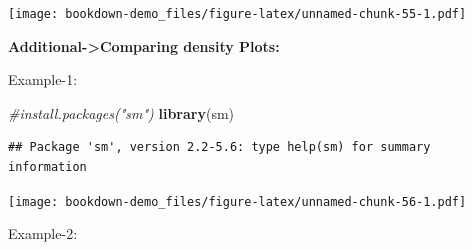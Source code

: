 \documentclass[]{book}
\newenvironment{Shaded}{\begin{snugshade}}{\end{snugshade}}
\newcommand{\KeywordTok}[1]{\textcolor[rgb]{0.13,0.29,0.53}{\textbf{#1}}}
\newcommand{\DataTypeTok}[1]{\textcolor[rgb]{0.13,0.29,0.53}{#1}}
\newcommand{\StringTok}[1]{\textcolor[rgb]{0.31,0.60,0.02}{#1}}
\newcommand{\CommentTok}[1]{\textcolor[rgb]{0.56,0.35,0.01}{\textit{#1}}}
\newcommand{\OperatorTok}[1]{\textcolor[rgb]{0.81,0.36,0.00}{\textbf{#1}}}
\newcommand{\NormalTok}[1]{#1}
\begin{document}
\texttt{[image: bookdown-demo\_files/figure-latex/unnamed-chunk-55-1.pdf]}

\textbf{Additional-\textgreater{}Comparing density Plots:}

Example-1:

\begin{Shaded}
\begin{Highlighting}[]
\CommentTok{#install.packages("sm")}
\KeywordTok{library}\NormalTok{(sm)}
\end{Highlighting}
\end{Shaded}

\begin{verbatim}
## Package 'sm', version 2.2-5.6: type help(sm) for summary information
\end{verbatim}

\begin{Shaded}
\end{Shaded}

\texttt{[image: bookdown-demo\_files/figure-latex/unnamed-chunk-56-1.pdf]}

Example-2:
\end{document}
